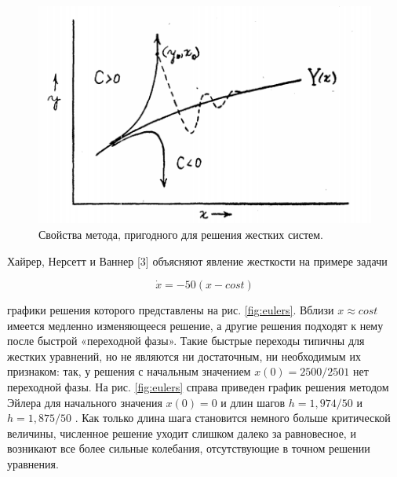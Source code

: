\documentclass[12pt,a4paper]{book}
\begin{document}
 \setcounter{figure}{6}
\begin{figure}[h!]
 	\centering
 	\includegraphics[width=0.7\linewidth]{method_prop}
 	\caption{Свойства метода, пригодного для решения жестких систем.}
 	\label{fig:methodprop}
\end{figure}
\newpage
 
Хайрер, Нерсетт и Ваннер [3] объясняют явление жесткости на примере задачи

\setcounter{equation}{31}
\begin{equation}
\dot{x} = -50(x-cost)
\label{for}
\end{equation}

графики решения которого представлены на рис. \ref{fig:eulers}.  Вблизи $ x \approx cost $  имеется медленно изменяющееся решение, а другие решения подходят к нему после быстрой «переходной фазы». Такие быстрые переходы типичны для жестких уравнений, но не являются ни достаточным, ни необходимым их признаком: так, у решения с начальным значением $ x(0) = 2500/2501 $  нет переходной фазы. На рис. \ref{fig:eulers} справа приведен график решения методом Эйлера для начального значения $ x(0) = 0 $  и длин шагов $ h = 1,974/50 $  и $ h = 1,875/50 $ . Как только длина шага становится немного больше критической величины, численное решение уходит слишком далеко за равновесное, и возникают все более сильные колебания, отсутствующие в точном решении уравнения.
\end{document}
